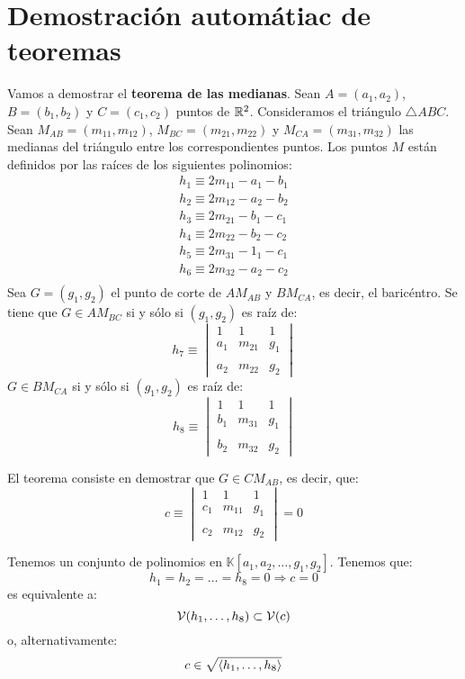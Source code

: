 \documentclass[twoside]{report}
\def\a{\alpha}
\def\b{\beta}
\begin{document}
\section{Demostración automátiac de teoremas}
Vamos a demostrar el \textbf{teorema de las medianas}.
Sean $A=(a_1,a_2)$, $B=(b_1,b_2)$ y $C=(c_1,c_2)$ puntos de $\mathbb{R}^2$.
Consideramos el triángulo $\triangle ABC$.
Sean $M_{AB}=(m_{11},m_{12})$, $M_{BC}=(m_{21},m_{22})$ y $M_{CA}=(m_{31},m_{32})$ las medianas del triángulo entre los correspondientes puntos.
Los puntos $M$ están definidos por las raíces de los siguientes polinomios:
\begin{align*}
	h_1 \equiv 2m_{11}-a_1-b_1\\
	h_2 \equiv 2m_{12}-a_2-b_2\\
	h_3 \equiv 2m_{21}-b_1-c_1\\
	h_4 \equiv 2m_{22}-b_2-c_2\\
	h_5 \equiv 2m_{31}-1_1-c_1\\
	h_6 \equiv 2m_{32}-a_2-c_2\\
\end{align*}
Sea $G=(g_1,g_2)$ el punto de corte de $AM_{AB}$ y $BM_{CA}$, es decir, el baricéntro.
Se tiene que $G \in AM_{BC}$ si y sólo si $(g_1,g_2)$ es raíz de:
\[ h_7 \equiv \begin{vmatrix}1 & 1 & 1\\a_1 & m_{21} & g_1\\\\a_2 & m_{22} & g_2\end{vmatrix} \]
$G \in BM_{CA}$ si y sólo si $(g_1,g_2)$ es raíz de:
\[ h_8 \equiv \begin{vmatrix}1 & 1 & 1\\b_1 & m_{31} & g_1\\\\b_2 & m_{32} & g_2\end{vmatrix} \]

El teorema consiste en demostrar que $G \in CM_{AB}$, es decir, que:
\[ c \equiv \begin{vmatrix}1 & 1 & 1\\c_1 & m_{11} & g_1\\\\c_2 & m_{12} & g_2\end{vmatrix} = 0 \]

Tenemos un conjunto de polinomios en $\mathbb{K}[a_1,a_2,\dots,g_1,g_2]$.
Tenemos que:
\[ h_1=h_2=\dots=h_8 = 0 \Rightarrow c=0 \]
es equivalente a:
\[ \mathcal{V}(h_1,\dots,h_8) \subset \mathcal{V}(c) \]
o, alternativamente:
\[ c \in \sqrt{\langle{h_1,\dots,h_8}\rangle} \]
\end{document}
